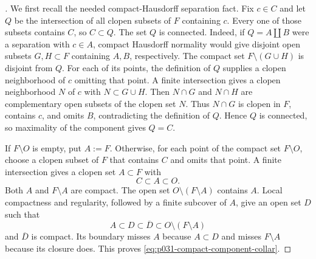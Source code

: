 
\begin{proof}[]
We first recall the needed compact-Hausdorff separation fact.  Fix $c\in C$
and let $Q$ be the intersection of all clopen subsets of $F$ containing
$c$.  Every one of those subsets contains $C$, so $C\subset Q$.  The set
$Q$ is connected.  Indeed, if $Q=A\amalg B$ were a separation with
$c\in A$, compact Hausdorff normality would give disjoint open subsets
$G,H\subset F$ containing $A,B$, respectively.  The compact set
$F\setminus(G\cup H)$ is disjoint from $Q$.  For each of its points, the
definition of $Q$ supplies a clopen neighborhood of $c$ omitting that
point.  A finite intersection gives a clopen neighborhood $N$ of $c$ with
$N\subset G\cup H$.  Then $N\cap G$ and $N\cap H$ are complementary open
subsets of the clopen set $N$.  Thus $N\cap G$ is clopen in $F$, contains
$c$, and omits $B$, contradicting the definition of $Q$.  Hence $Q$ is connected,
so maximality of the component gives $Q=C$.

If $F\setminus O$ is empty, put $A:=F$.  Otherwise, for each point of the
compact set $F\setminus O$, choose a clopen subset of $F$ that contains $C$
and omits that point.  A finite intersection gives a clopen set
$A\subset F$ with
\[
                         C\subset A\subset O.
\]
Both $A$ and $F\setminus A$ are compact.  The open set
$O\setminus(F\setminus A)$ contains $A$.  Local compactness and regularity,
followed by a finite subcover of $A$, give an open set $D$ such that
\[
 A\subset D\subset\overline D
             \subset O\setminus(F\setminus A)
\]
and $\overline D$ is compact.  Its boundary misses $A$ because $A\subset D$
and misses $F\setminus A$ because its closure does.  This proves
\eqref{eq:p031-compact-component-collar}.
\end{proof}

